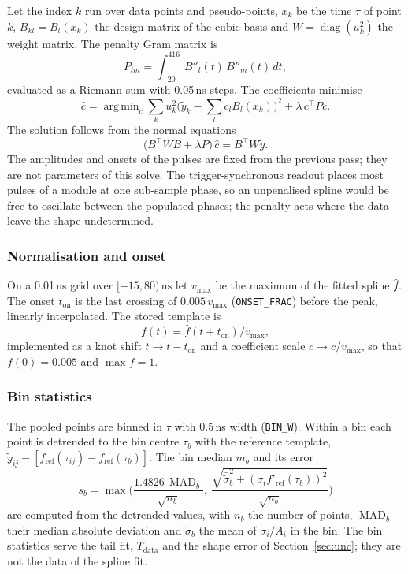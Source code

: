 \documentclass[11pt]{article}
\newcommand{\ns}{\,\mathrm{ns}}
\newcommand{\code}[1]{\texttt{#1}}
\DeclareMathOperator*{\argmin}{arg\,min}
\DeclareMathOperator{\MAD}{MAD}
\begin{document}
Let the index $k$ run over data points and pseudo-points, $x_k$ be the time $\tau$ of point $k$, $B_{kl} = B_l(x_k)$ the design matrix of the cubic basis and $W = \operatorname{diag}(u_k^2)$ the weight matrix. The penalty Gram matrix is
\begin{equation}
P_{lm} = \int_{-20}^{416} B''_l(t)\, B''_m(t)\, dt,
\end{equation}
evaluated as a Riemann sum with 0.05\,ns steps. The coefficients minimise
\begin{equation}
\hat c = \argmin_c \sum_k u_k^2 \Big( \tilde y_k - \sum_l c_l B_l(x_k) \Big)^2 + \lambda\, c^{\top} P c .
\end{equation}
The solution follows from the normal equations
\begin{equation}
\big( B^{\top} W B + \lambda P \big)\, \hat c = B^{\top} W \tilde y .
\label{eq:normal}
\end{equation}
The amplitudes and onsets of the pulses are fixed from the previous pass; they are not parameters of this solve. The trigger-synchronous readout places most pulses of a module at one sub-sample phase, so an unpenalised spline would be free to oscillate between the populated phases; the penalty acts where the data leave the shape undetermined.

\subsubsection{Normalisation and onset}
\label{sec:finalize}

On a 0.01\,ns grid over $[-15, 80)\ns$ let $v_{\max}$ be the maximum of the fitted spline $\hat f$. The onset $t_{\mathrm{on}}$ is the last crossing of $0.005\, v_{\max}$ (\code{ONSET\_FRAC}) before the peak, linearly interpolated. The stored template is
\begin{equation}
f(t) = \hat f(t + t_{\mathrm{on}}) / v_{\max},
\end{equation}
implemented as a knot shift $t \to t - t_{\mathrm{on}}$ and a coefficient scale $c \to c / v_{\max}$, so that $f(0) = 0.005$ and $\max f = 1$.

\subsubsection{Bin statistics}
\label{sec:bins}

The pooled points are binned in $\tau$ with 0.5\,ns width (\code{BIN\_W}). Within a bin each point is detrended to the bin centre $\tau_b$ with the reference template, $\tilde y_{ij} - [f_{\mathrm{ref}}(\tau_{ij}) - f_{\mathrm{ref}}(\tau_b)]$. The bin median $m_b$ and its error
\begin{equation}
s_b = \max\Big( \frac{1.4826\, \MAD_b}{\sqrt{n_b}},\ \frac{\sqrt{\bar{\tilde\sigma}_b^2 + (\sigma_t f'_{\mathrm{ref}}(\tau_b))^2}}{\sqrt{n_b}} \Big)
\label{eq:sb}
\end{equation}
are computed from the detrended values, with $n_b$ the number of points, $\MAD_b$ their median absolute deviation and $\bar{\tilde\sigma}_b$ the mean of $\sigma_i/A_i$ in the bin. The bin statistics serve the tail fit, $T_{\mathrm{data}}$ and the shape error of Section~\ref{sec:unc}; they are not the data of the spline fit.
\end{document}
